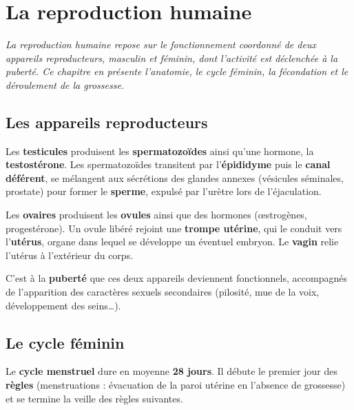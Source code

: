 \chapter{La reproduction humaine}

\noindent\textit{La reproduction humaine repose sur le fonctionnement coordonné de deux
appareils reproducteurs, masculin et féminin, dont l'activité est déclenchée à la
puberté. Ce chapitre en présente l'anatomie, le cycle féminin, la fécondation et le
déroulement de la grossesse.}
\vspace{8pt}

\connecteBanner

\section{Les appareils reproducteurs}

\begin{propriete}
Les \textbf{testicules} produisent les \textbf{spermatozoïdes} ainsi qu'une hormone, la
\textbf{testostérone}. Les spermatozoïdes transitent par l'\textbf{épididyme} puis le
\textbf{canal déférent}, se mélangent aux sécrétions des glandes annexes (vésicules
séminales, prostate) pour former le \textbf{sperme}, expulsé par l'urètre lors de
l'éjaculation.
\end{propriete}

\begin{propriete}
Les \textbf{ovaires} produisent les \textbf{ovules} ainsi que des hormones (œstrogènes,
progestérone). Un ovule libéré rejoint une \textbf{trompe utérine}, qui le conduit vers
l'\textbf{utérus}, organe dans lequel se développe un éventuel embryon. Le \textbf{vagin}
relie l'utérus à l'extérieur du corps.
\end{propriete}

\begin{remarque}
C'est à la \textbf{puberté} que ces deux appareils deviennent fonctionnels, accompagnés
de l'apparition des caractères sexuels secondaires (pilosité, mue de la voix, développement
des seins\dots).
\end{remarque}

\section{Le cycle féminin}

\begin{definition}
Le \textbf{cycle menstruel} dure en moyenne \textbf{28 jours}. Il débute le premier jour
des \textbf{règles} (menstruations : évacuation de la paroi utérine en l'absence de
grossesse) et se termine la veille des règles suivantes.
\end{definition}

